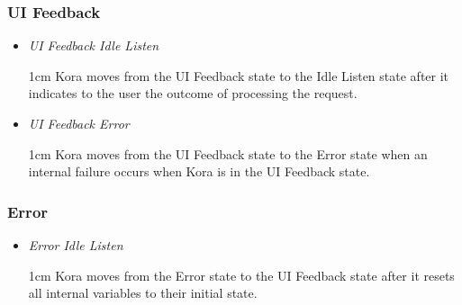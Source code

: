 \documentclass[onecolumn, draftclsnofoot,10pt, compsoc]{IEEEtran}
\def \botname{Kora\xspace}
\newenvironment{indentItem}[1][1cm]{\begin{adjustwidth}{#1}{}}{\end{adjustwidth}}
\begin{document}
		\subsubsection{UI Feedback}
		\begin{itemize}
			\item \textit{UI Feedback \textrightarrow{} Idle Listen}
			\begin{indentItem}
				\botname moves from the UI Feedback state to the Idle Listen state after it indicates to the user the outcome of processing the request.
			\end{indentItem}
			\item \textit{UI Feedback \textrightarrow{} Error}
			\begin{indentItem}
				\botname moves from the UI Feedback state to the Error state when an internal failure occurs when \botname is in the UI Feedback state.
			\end{indentItem}
		\end{itemize}
		
		\subsubsection{Error}
		\begin{itemize}
			\item \textit{Error \textrightarrow{} Idle Listen}
			\begin{indentItem}
				\botname moves from the Error state to the UI Feedback state after it resets all internal variables to their initial state.
			\end{indentItem}
		\end{itemize}
\end{document}
